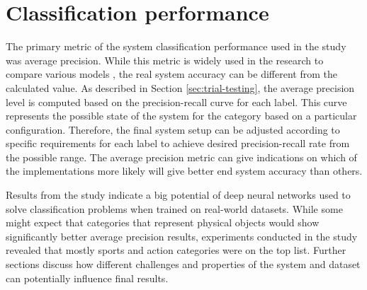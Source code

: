 
\section{Classification performance}
The primary metric of the system classification performance used in the study was average precision. While this metric is widely used in the research to compare various models \cite{Everingham2010PASCAL-VOC}, the real system accuracy can be different from the calculated value. As described in Section \ref{sec:trial-testing}, the average precision level is computed based on the precision-recall curve for each label. This curve represents the possible state of the system for the category based on a particular configuration. Therefore, the final system setup can be adjusted according to specific requirements for each label to achieve desired precision-recall rate from the possible range. The average precision metric can give indications on which of the implementations more likely will give better end system accuracy than others.

Results from the study indicate a big potential of deep neural networks used to solve classification problems when trained on real-world datasets. While some might expect that categories that represent physical objects would show significantly better average precision results, experiments conducted in the study revealed that mostly sports and action categories were on the top list. Further sections discuss how different challenges and properties of the system and dataset can potentially influence final results.





